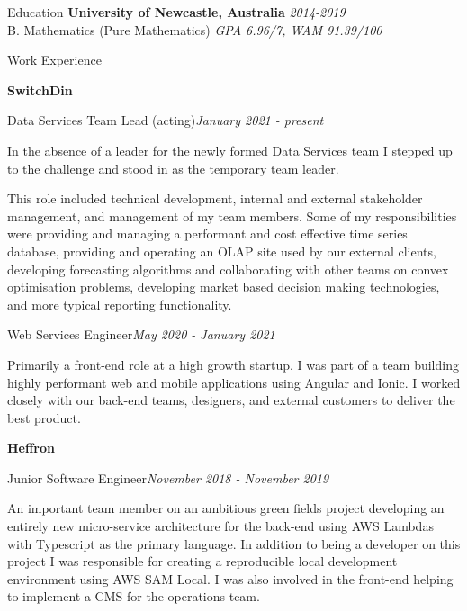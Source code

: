 \documentclass{resume} %
\begin{document}

\begin{rSection}{Education}
    {\bf University of Newcastle, Australia} \hfill {\em 2014-2019}
    \\ B. Mathematics (Pure Mathematics) \hfill {\em GPA 6.96/7, WAM 91.39/100}
\end{rSection}


\begin{rSection}{Work Experience}

{\bf SwitchDin}

\begin{adjustwidth}{2em}{}
    \begin{rSubsection}{Data Services Team Lead (acting)}{\em January 2021 - present}{}{}
    \item In the absence of a leader for the newly formed Data Services team I stepped up to the challenge and stood in as the temporary team leader.
    \item This role included technical development, internal and external stakeholder management, and management of my team members. Some of my responsibilities were providing and managing a performant and cost effective time series database, providing and operating an OLAP site used by our external clients, developing forecasting algorithms and collaborating with other teams on convex optimisation problems, developing market based decision making technologies, and more typical reporting functionality.
    \end{rSubsection}

    \begin{rSubsection}{Web Services Engineer}{\em May 2020 - January 2021}{}{}
    \item Primarily a front-end role at a high growth startup. I was part of a team building highly performant web and mobile applications using Angular and Ionic. I worked closely with our back-end teams, designers, and external customers to deliver the best product.
    \end{rSubsection}
\end{adjustwidth}

{\bf Heffron}

\begin{adjustwidth}{2em}{}
    \begin{rSubsection}{Junior Software Engineer}{\em November 2018 - November 2019}{}{}
    \item An important team member on an ambitious green fields project developing an entirely new micro-service architecture for the back-end using AWS Lambdas with Typescript as the primary language. In addition to being a developer on this project I was responsible for creating a reproducible local development environment using AWS SAM Local. I was also involved in the front-end helping to implement a CMS for the operations team.
    \end{rSubsection}


\end{adjustwidth}
\end{rSection}
\end{document}
